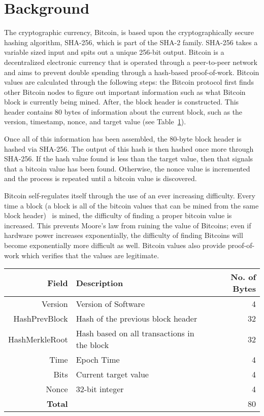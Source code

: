 \section{Background}

The cryptographic currency, Bitcoin, is based upon the cryptographically secure hashing algorithm, SHA-256, which is part of the SHA-2 family.
SHA-256 takes a variable sized input and spits out a unique 256-bit output.
Bitcoin is a decentralized electronic currency that is operated through a peer-to-peer network and aims to prevent double spending through a hash-based proof-of-work.
Bitcoin values are calculated through the following steps: the Bitcoin protocol first finds other Bitcoin nodes to figure out important information such as what Bitcoin block is currently being mined.
After, the block header is constructed.
This header contains 80 bytes of information about the current block, such as the version, timestamp, nonce, and target value (see Table~\ref{bitcoin_header}).

Once all of this information has been assembled, the 80-byte block header is hashed via SHA-256.
The output of this hash is then hashed once more through SHA-256.
If the hash value found is less than the target value, then that signals that a bitcoin value has been found.
Otherwise, the nonce value is incremented and the process is repeated until a bitcoin value is discovered.

Bitcoin self-regulates itself through the use of an ever increasing difficulty.
Every time a block (a block is all of the bitcoin values that can be mined from the same block header)  is mined, the difficulty of finding a proper bitcoin value is increased.
This prevents Moore’s law from ruining the value of Bitcoins; even if hardware power increases exponentially, the difficulty of finding Bitcoins will become exponentially more difficult as well.
Bitcoin values also provide proof-of-work which verifies that the values are legitimate.

\begin{table}
\label{bitcoin_header}
\begin{tabular}{r| p{9cm} | r}
  \hline
  \hline
  {\bf Field} & {\bf Description} & {\bf No. of Bytes} \\
  \hline
  Version & Version of Software & 4 \\
  HashPrevBlock & Hash of the previous block header & 32 \\
  HashMerkleRoot & Hash based on all transactions in the block & 32 \\
  Time & Epoch Time & 4 \\
  Bits & Current target value & 4 \\
  Nonce & 32-bit integer & 4 \\
  {\bf Total} & & 80 \\
  \hline
\end{tabular}
\end{table}


